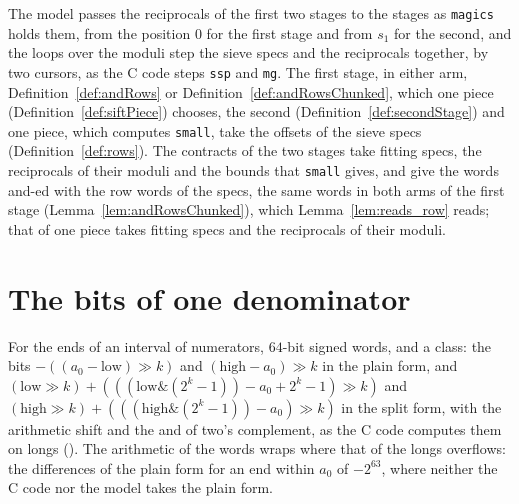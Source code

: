The model passes the reciprocals of the first two stages to the stages as \verb|magics| holds them,
from the position $0$ for the first stage and from $s_1$ for the second, and the loops over the
moduli step the sieve specs and the reciprocals together, by two cursors, as the C code steps
\verb|ssp| and \verb|mg|. The first stage, in either arm, Definition~\ref{def:andRows} or
Definition~\ref{def:andRowsChunked}, which one piece (Definition~\ref{def:siftPiece}) chooses, the
second (Definition~\ref{def:secondStage}) and one piece, which computes \verb|small|, take the
offsets of the sieve specs (Definition~\ref{def:rows}). The contracts of the two stages take fitting
specs, the reciprocals of their moduli and the bounds that \verb|small| gives, and give the words
and-ed with the row words of the specs, the same words in both arms of the first stage
(Lemma~\ref{lem:andRowsChunked}), which Lemma~\ref{lem:reads_row} reads; that of one piece takes
fitting specs and the reciprocals of their moduli.

\section{The bits of one denominator}\label{sec:bits}

\begin{definition}\label{def:numeratorsToBits}
  \leanok
  For the ends of an interval of numerators, $64$-bit signed words, and a class: the bits
  $-((a_0 - \mathrm{low}) \gg k)$ and $(\mathrm{high} - a_0) \gg k$ in the plain form, and
  $(\mathrm{low} \gg k) + (((\mathrm{low} \mathbin{\&} (2^k - 1)) - a_0 + 2^k - 1) \gg k)$ and
  $(\mathrm{high} \gg k) + (((\mathrm{high} \mathbin{\&} (2^k - 1)) - a_0) \gg k)$ in the split
  form, with the arithmetic shift and the and of two's complement, as the C code computes them on
  longs (). The arithmetic of the words wraps where that of the
  longs overflows: the differences of the plain form for an end within $a_0$ of $-2^{63}$, where
  neither the C code nor the model takes the plain form.
\end{definition}

